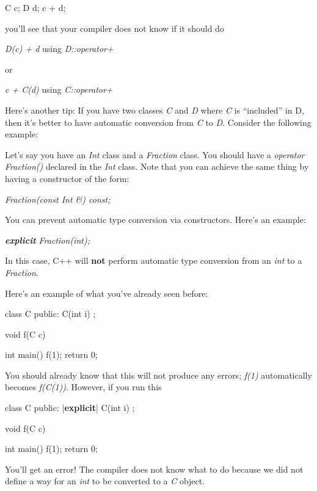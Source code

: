 \begin{consolethree}[escapeinside=||]
C c;
D d;
c + d;
\end{consolethree}

you'll see that your compiler does not know if it should do

\textit{D(c) + d} using \textit{D::operator+}

or

\textit{c + C(d)} using \textit{C::operator+}

Here's another tip: If you have two classes \textit{C} and
\textit{D} where \textit{C} is ``included'' in D, then it's
better to have automatic conversion from \textit{C} to \textit{D}. Consider
the following example:

Let's say you have an \textit{Int} class and a
\textit{Fraction} class. You should have a \textit{operator Fraction()}
declared in the \textit{Int} class. Note that you can achieve the same
thing by having a constructor of the form:

\textit{Fraction(const Int \&) const;}


\newpage{}

You can prevent automatic type conversion via constructors.
Here's an example:

\textit{\textbf{explicit} Fraction(int);}

In this case, C++ will \textbf{not} perform automatic type conversion
from an \textit{int} to a \textit{Fraction}.

Here's an example of what you've already seen before:

\begin{consolethree}[escapeinside=||]
class C
{
public:
    C(int i)
    {}
};

void f(C c)
{
}

int main()
{
    f(1);
    return 0;
}
\end{consolethree}

You should already know that this will not produce any errors;
\textit{f(1)} automatically becomes \textit{f(C(1))}. However, if you run
this

\begin{consolethree}[escapeinside=||]
class C
{
public:
    |{\bf explicit}| C(int i)
    {}
};

void f(C c)
{
}

int main()
{
    f(1);
    return 0;
}
\end{consolethree}

You'll get an error! The compiler does not know what to
do because we did not define a way for an \textit{int} to be converted to
a \textit{C} object.

